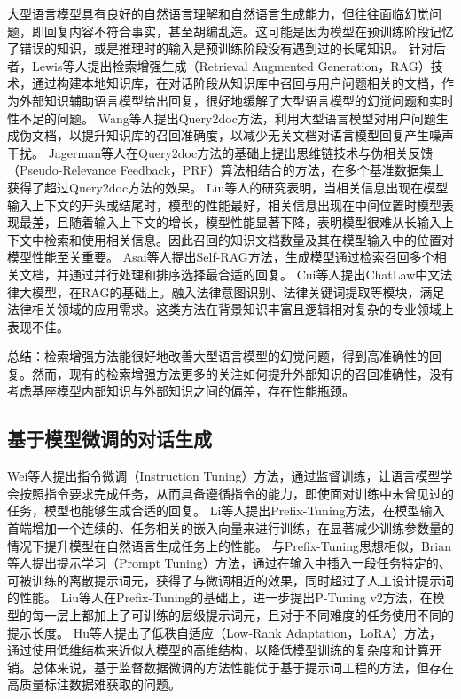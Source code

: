 大型语言模型具有良好的自然语言理解和自然语言生成能力，但往往面临幻觉问题，即回复内容不符合事实，甚至胡编乱造。这可能是因为模型在预训练阶段记忆了错误的知识，或是推理时的输入是预训练阶段没有遇到过的长尾知识。
针对后者，Lewis等人\cite{DBLP:conf/nips/LewisPPPKGKLYR020}提出检索增强生成（Retrieval Augmented Generation，RAG）技术，通过构建本地知识库，在对话阶段从知识库中召回与用户问题相关的文档，作为外部知识辅助语言模型给出回复，很好地缓解了大型语言模型的幻觉问题和实时性不足的问题。
Wang等人\cite{DBLP:conf/emnlp/WangYW23}提出Query2doc方法，利用大型语言模型对用户问题生成伪文档，以提升知识库的召回准确度，以减少无关文档对语言模型回复产生噪声干扰。
Jagerman等人\cite{DBLP:journals/corr/abs-2305-03653}在Query2doc方法的基础上提出思维链技术与伪相关反馈（Pseudo-Relevance Feedback，PRF）算法相结合的方法，在多个基准数据集上获得了超过Query2doc方法的效果。
Liu等人\cite{DBLP:journals/corr/abs-2307-03172}的研究表明，当相关信息出现在模型输入上下文的开头或结尾时，模型的性能最好，相关信息出现在中间位置时模型表现最差，且随着输入上下文的增长，模型性能显著下降，表明模型很难从长输入上下文中检索和使用相关信息。因此召回的知识文档数量及其在模型输入中的位置对模型性能至关重要。
Asai等人\cite{DBLP:journals/corr/abs-2310-11511}提出Self-RAG方法，生成模型通过检索召回多个相关文档，并通过并行处理和排序选择最合适的回复。
Cui等人\cite{DBLP:journals/corr/abs-2306-16092}提出ChatLaw中文法律大模型，在RAG的基础上。融入法律意图识别、法律关键词提取等模块，满足法律相关领域的应用需求。这类方法在背景知识丰富且逻辑相对复杂的专业领域上表现不佳。

总结：检索增强方法能很好地改善大型语言模型的幻觉问题，得到高准确性的回复。然而，现有的检索增强方法更多的关注如何提升外部知识的召回准确性，没有考虑基座模型内部知识与外部知识之间的偏差，存在性能瓶颈。

\subsection{基于模型微调的对话生成}

Wei等人\cite{DBLP:conf/iclr/WeiBZGYLDDL22}提出指令微调（Instruction Tuning）方法，通过监督训练，让语言模型学会按照指令要求完成任务，从而具备遵循指令的能力，即使面对训练中未曾见过的任务，模型也能够生成合适的回复。
Li等人\cite{DBLP:conf/acl/LiL20}提出Prefix-Tuning方法，在模型输入首端增加一个连续的、任务相关的嵌入向量来进行训练，在显著减少训练参数量的情况下提升模型在自然语言生成任务上的性能。
与Prefix-Tuning思想相似，Brian等人\cite{lester-etal-2021-power}提出提示学习（Prompt Tuning）方法，通过在输入中插入一段任务特定的、可被训练的离散提示词元，获得了与微调相近的效果，同时超过了人工设计提示词的性能。
Liu等人\cite{DBLP:journals/corr/abs-2110-07602}在Prefix-Tuning的基础上，进一步提出P-Tuning v2方法，在模型的每一层上都加上了可训练的层级提示词元，且对于不同难度的任务使用不同的提示长度。
Hu等人\cite{DBLP:conf/iclr/HuSWALWWC22}提出了低秩自适应（Low-Rank Adaptation，LoRA）方法，通过使用低维结构来近似大模型的高维结构，以降低模型训练的复杂度和计算开销。总体来说，基于监督数据微调的方法性能优于基于提示词工程的方法，但存在高质量标注数据难获取的问题。

